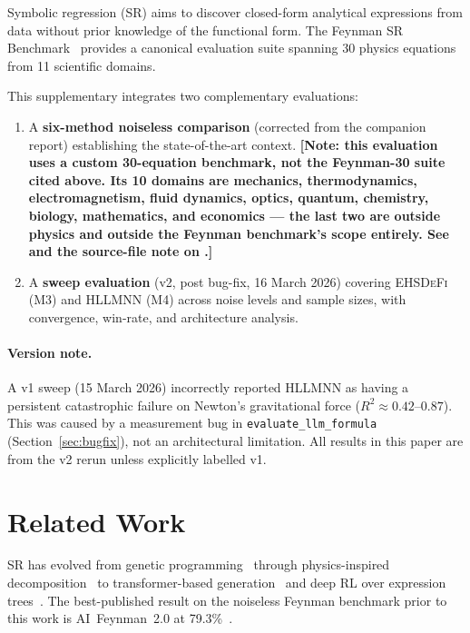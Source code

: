 \documentclass[twoside,11pt]{article}
\newcommand{\EHD}{\textsc{EHSDeFi}}
\newcommand{\HSL}{\textsc{HLLMNN}}
\newcommand{\Rsq}{R^{2}}
\begin{document}
Symbolic regression (SR) aims to discover closed-form analytical expressions
from data without prior knowledge of the functional form.  The Feynman SR
Benchmark~\citep{udrescu2020ai} provides a canonical evaluation suite spanning
30 physics equations from 11 scientific domains.

This supplementary integrates two complementary evaluations:
\begin{enumerate}
  \item A \textbf{six-method noiseless comparison} (corrected from the
    companion report) establishing the state-of-the-art context. \textbf{[Note:
    this evaluation uses a custom 30-equation benchmark, not the Feynman-30
    suite cited above. Its 10 domains are mechanics, thermodynamics,
    electromagnetism, fluid dynamics, optics, quantum, chemistry, biology,
    mathematics, and economics --- the last two are outside physics and
    outside the Feynman benchmark's scope entirely. See
     and the source-file note on .]}
  \item A \textbf{sweep evaluation} (v2, post bug-fix, 16 March 2026)
    covering \EHD{} (M3) and \HSL{} (M4) across noise levels and sample
    sizes, with convergence, win-rate, and architecture analysis.
\end{enumerate}

\paragraph{Version note.}
A v1 sweep (15 March 2026) incorrectly reported \HSL{} as having a persistent
catastrophic failure on Newton's gravitational force ($\Rsq \approx 0.42$--$0.87$).
This was caused by a measurement bug in \texttt{evaluate\_llm\_formula}
(Section~\ref{sec:bugfix}), not an architectural limitation.  All results in
this paper are from the v2 rerun unless explicitly labelled v1.

\section{Related Work}
\label{suppb:related}

SR has evolved from genetic programming~\citep{schmidt2009distilling} through
physics-inspired decomposition~\citep{udrescu2020ai} to transformer-based
generation~\citep{biggio2021neural,shojaee2023transformer} and deep RL over
expression trees~\citep{petersen2021deep}.  The best-published result on the
noiseless Feynman benchmark prior to this work is AI~Feynman~2.0 at
79.3\%~\citep{udrescu2020aifeynman2}.
\end{document}
